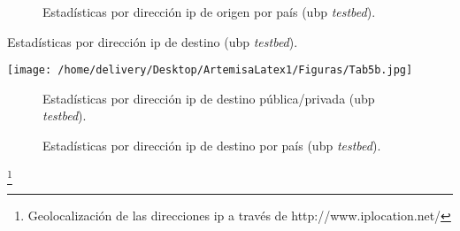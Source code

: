 \documentclass[a4paper,12pt]{report}
\begin{document}
{\begin{figure}[h!]
 \centering
 \caption{Estadísticas por dirección \ac{ip} de origen por país (\ac{ubp} \emph{testbed}).}
\label{ip_origen_pais_ubp}
\end{figure}

\begin{table}[h!]
\caption{Estadísticas por dirección \ac{ip} de destino (\ac{ubp} \emph{testbed}).}
\centering
\texttt{[image: /home/delivery/Desktop/ArtemisaLatex1/Figuras/Tab5b.jpg]}
\label{tabla_ip_destino_ubp}
\end{table}
\clearpage

\begin{figure}[h!]
 \centering
 \caption{Estadísticas por dirección \ac{ip} de destino pública/privada (\ac{ubp}
\emph{testbed}).}
\label{ip_destino_pp_ubp}
\end{figure}

\begin{figure}[h!]
 \centering
 \caption{Estadísticas por dirección \ac{ip} de destino por país (\ac{ubp}
\emph{testbed}).}
\label{ip_destino_pais_ubp}
\end{figure}

\footnote{Geolocalización de las direcciones \ac{ip} a través
de http://www.iplocation.net/}

}
\end{document}
